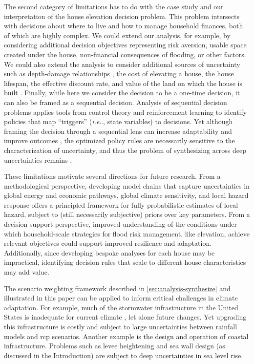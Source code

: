 \documentclass[11pt]{article}
\makeatletter
\DeclareRobustCommand\onedot{\futurelet\@let@token\@onedot}
\def\@onedot{\ifx\@let@token.\else.\null\fi\xspace}
\def\ie{\emph{i.e}\onedot} \def\Ie{\emph{I.e}\onedot}
\DeclareRobustCommand\onedot{\futurelet\@let@token\@onedot}
\def\@onedot{\ifx\@let@token.\else.\null\fi\xspace}
\def\ie{\emph{i.e}\onedot} \def\Ie{\emph{I.e}\onedot}
\makeatother
\begin{document}
The second category of limitations has to do with the case study and our interpretation of the house elevation decision problem.
This problem intersects with decisions about where to live and how to manage household finances, both of which are highly complex.
We could extend our analysis, for example, by considering additional decision objectives representing risk aversion, usable space created under the house, non-financial consequences of flooding, or other factors.
We could also extend the analysis to consider additional sources of uncertainty such as depth-damage relationships \citep{Rozer:2019,nofal_fragility:2020}, the cost of elevating a house, the house lifespan, the effective discount rate, and value of the land on which the house is built \citep[provides a framework for addressing some of these]{zarekarizi_suboptimal:2020}.
Finally, while here we consider the decision to be a one-time decision, it can also be framed as a sequential decision.
Analysis of sequential decision problems applies tools from control theory and reinforcement learning to identify policies that map ``triggers'' (\ie, state variables) to decisions.
Yet although framing the decision through a sequential lens can increase adaptability and improve outcomes \citep{fletcher:2017,garner_slrise:2018}, the optimized policy rules are necessarily sensitive to the characterization of uncertainty, and thus the problem of synthesizing across deep uncertainties remains \citep{herman_control:2020}.

These limitations motivate several directions for future research.
From a methodological perspective, developing model chains that capture uncertainties in global energy and economic pathways, global climate sensitivity, and local hazard response \citep[see fig.~1 of][]{moss_uncertainties:2000} offers a principled framework for fully probabilistic estimates of local hazard, subject to (still necessarily subjective) priors over key parameters.
From a decision support perspective, improved understanding of the conditions under which household-scale strategies for flood risk management, like elevation, achieve relevant objectives could support improved resilience and adaptation.
Additionally, since developing bespoke analyses for each house may be impractical, identifying decision rules that scale to different house characteristics may add value.

The scenario weighting framework described in \cref{sec:analysis-synthesize} and illustrated in this paper can be applied to inform critical challenges in climate adaptation.
For example, much of the stormwater infrastructure in the United States is inadequate for current climate \citep{lopez-cantu:2018}, let alone future changes.
Yet upgrading this infrastructure is costly and subject to large uncertainties between rainfall models \citep{sharma_rcp:2021} and \gls{rcp} scenarios.
Another example is the design and operation of coastal infrastructure.
Problems such as levee heightening \citep{garner_slrise:2018,oddo_coastal:2017,vandantzig_dike:1956} and sea wall design (as discussed in the Introduction) are subject to deep uncertainties in sea level rise.
\end{document}
